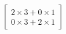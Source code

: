 \documentclass[preview]{standalone}
\begin{document}
\begin{align*}
\begin{bmatrix}  2\times3 + 0\times1 \\ 0\times3 + 2\times1 \end{bmatrix}
\end{align*}
\end{document}
